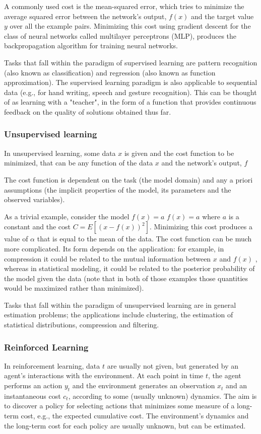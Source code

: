 \documentclass[12pt]{article}
\begin{document}
A commonly used cost is the mean-squared error, which tries to minimize the average squared error between the network's output, $f ( x )$  and the target value $y$ over all the example pairs. Minimizing this cost using gradient descent for the class of neural networks called multilayer perceptrons (MLP), produces the backpropagation algorithm for training neural networks.

Tasks that fall within the paradigm of supervised learning are pattern recognition (also known as classification) and regression (also known as function approximation). The supervised learning paradigm is also applicable to sequential data (e.g., for hand writing, speech and gesture recognition). This can be thought of as learning with a "teacher", in the form of a function that provides continuous feedback on the quality of solutions obtained thus far.
        \subsubsection{Unsupervised learning}
        In unsupervised learning, some data $x$ is given and the cost function to be minimized, that can be any function of the data $x$ and the network's output, $f$
        
The cost function is dependent on the task (the model domain) and any a priori assumptions (the implicit properties of the model, its parameters and the observed variables).

As a trivial example, consider the model $f ( x ) = a$  $f(x)=a$ where $a$ is a constant and the cost $C=E[(x-f(x))^2]$. Minimizing this cost produces a value of $\alpha$ that is equal to the mean of the data. The cost function can be much more complicated. Its form depends on the application: for example, in compression it could be related to the mutual information between $x$  and $f ( x )$ , whereas in statistical modeling, it could be related to the posterior probability of the model given the data (note that in both of those examples those quantities would be maximized rather than minimized).

Tasks that fall within the paradigm of unsupervised learning are in general estimation problems; the applications include clustering, the estimation of statistical distributions, compression and filtering.
        \subsubsection{Reinforced Learning}
        In reinforcement learning, data $t$ are usually not given, but generated by an agent's interactions with the environment. At each point in time $t$, the agent performs an action $y_t$ and the environment generates an observation $x_t$ and an instantaneous cost $c_t$, according to some (usually unknown) dynamics. The aim is to discover a policy for selecting actions that minimizes some measure of a long-term cost, e.g., the expected cumulative cost. The environment's dynamics and the long-term cost for each policy are usually unknown, but can be estimated.
        
\end{document}
